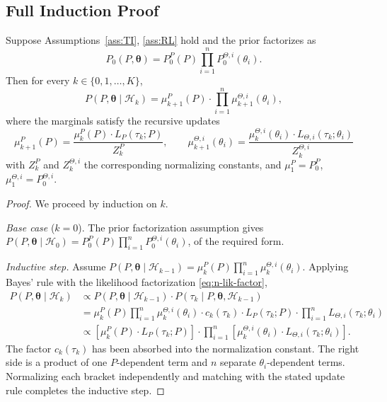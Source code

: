 \subsection{Full Induction Proof}

\begin{theorem}
\label{thm:n-player}
Suppose Assumptions~\ref{ass:TI}, \ref{ass:RL} hold and the prior factorizes as
\begin{equation}
P_0(P, \boldsymbol{\theta}) = P_0^P(P) \prod_{i=1}^n P_0^{\Theta,i}(\theta_i).
\end{equation}
Then for every $k \in \{0, 1, \ldots, K\}$,
\begin{equation}
P(P, \boldsymbol{\theta} \mid \mathcal{H}_k) = \mu_{k+1}^P(P) \cdot \prod_{i=1}^n \mu_{k+1}^{\Theta,i}(\theta_i),
\end{equation}
where the marginals satisfy the recursive updates
\begin{equation}
\mu_{k+1}^P(P) = \frac{\mu_k^P(P) \cdot L_P(\tau_k; P)}{Z_k^P}, \qquad \mu_{k+1}^{\Theta,i}(\theta_i) = \frac{\mu_k^{\Theta,i}(\theta_i) \cdot L_{\Theta,i}(\tau_k; \theta_i)}{Z_k^{\Theta,i}}
\end{equation}
with $Z_k^P$ and $Z_k^{\Theta,i}$ the corresponding normalizing constants, and $\mu_1^P = P_0^P$, $\mu_1^{\Theta,i} = P_0^{\Theta,i}$.
\end{theorem}

\begin{proof}
We proceed by induction on $k$.

\textit{Base case} ($k=0$). The prior factorization assumption gives $P(P, \boldsymbol{\theta} \mid \mathcal{H}_0) = P_0^P(P) \prod_{i=1}^n P_0^{\Theta,i}(\theta_i)$, of the required form.

\textit{Inductive step.} Assume $P(P, \boldsymbol{\theta} \mid \mathcal{H}_{k-1}) = \mu_k^P(P) \prod_{i=1}^n \mu_k^{\Theta,i}(\theta_i)$. Applying Bayes' rule with the likelihood factorization \eqref{eq:n-lik-factor},
\begin{align}
P(P, \boldsymbol{\theta} \mid \mathcal{H}_k) &\propto P(P, \boldsymbol{\theta} \mid \mathcal{H}_{k-1}) \cdot P(\tau_k \mid P, \boldsymbol{\theta}, \mathcal{H}_{k-1}) \\
&= \mu_k^P(P) \prod_{i=1}^n \mu_k^{\Theta,i}(\theta_i) \cdot c_k(\tau_k) \cdot L_P(\tau_k; P) \cdot \prod_{i=1}^n L_{\Theta,i}(\tau_k; \theta_i) \\
&\propto \left[\mu_k^P(P) \cdot L_P(\tau_k; P)\right] \cdot \prod_{i=1}^n \left[\mu_k^{\Theta,i}(\theta_i) \cdot L_{\Theta,i}(\tau_k; \theta_i)\right].
\end{align}
The factor $c_k(\tau_k)$ has been absorbed into the normalization constant. The right side is a product of one $P$-dependent term and $n$ separate $\theta_i$-dependent terms. Normalizing each bracket independently and matching with the stated update rule completes the inductive step.
\end{proof}

